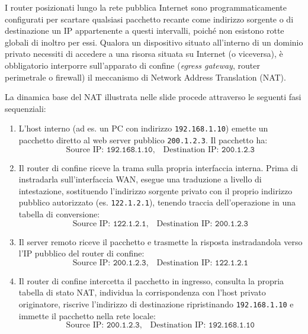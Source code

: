 \documentclass[11pt, a4paper]{article}
\begin{document}
I router posizionati lungo la rete pubblica Internet sono programmaticamente configurati per scartare qualsiasi pacchetto recante come indirizzo sorgente o di destinazione un IP appartenente a questi intervalli, poiché non esistono rotte globali di inoltro per essi. Qualora un dispositivo situato all'interno di un dominio privato necessiti di accedere a una risorsa situata su Internet (o viceversa), è obbligatorio interporre sull'apparato di confine (\emph{egress gateway}, router perimetrale o firewall) il meccanismo di Network Address Translation (NAT).


La dinamica base del NAT illustrata nelle slide procede attraverso le seguenti fasi sequenziali:
\begin{enumerate}
    \item L'host interno (ad es. un PC con indirizzo \texttt{192.168.1.10}) emette un pacchetto diretto al web server pubblico \texttt{200.1.2.3}. Il pacchetto ha:
    \[
    \text{Source IP: } \texttt{192.168.1.10}, \quad \text{Destination IP: } \texttt{200.1.2.3}
    \]
    \item Il router di confine riceve la trama sulla propria interfaccia interna. Prima di instradarla sull'interfaccia WAN, esegue una traduzione a livello di intestazione, sostituendo l'indirizzo sorgente privato con il proprio indirizzo pubblico autorizzato (es. \texttt{122.1.2.1}), tenendo traccia dell'operazione in una tabella di conversione:
    \[
    \text{Source IP: } \texttt{122.1.2.1}, \quad \text{Destination IP: } \texttt{200.1.2.3}
    \]
    \item Il server remoto riceve il pacchetto e trasmette la risposta instradandola verso l'IP pubblico del router di confine:
    \[
    \text{Source IP: } \texttt{200.1.2.3}, \quad \text{Destination IP: } \texttt{122.1.2.1}
    \]
    \item Il router di confine intercetta il pacchetto in ingresso, consulta la propria tabella di stato NAT, individua la corrispondenza con l'host privato originatore, riscrive l'indirizzo di destinazione ripristinando \texttt{192.168.1.10} e immette il pacchetto nella rete locale:
    \[
    \text{Source IP: } \texttt{200.1.2.3}, \quad \text{Destination IP: } \texttt{192.168.1.10}
    \]
\end{enumerate}
\end{document}
